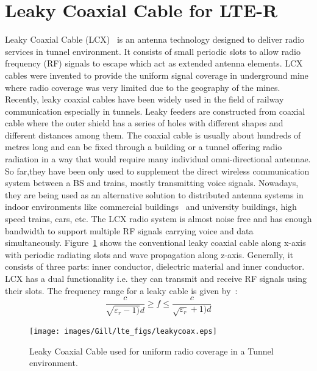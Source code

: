 \section{Leaky Coaxial Cable for LTE-R}
Leaky Coaxial Cable (LCX)~\cite{n1974leaky} is an antenna technology designed to deliver radio services in tunnel environment. It consists of small periodic slots to allow radio frequency (RF) signals to escape which act as extended antenna elements. LCX cables were invented to provide the uniform signal coverage in underground mine where radio coverage was very limited due to the geography of the mines. Recently, leaky coaxial cables have been widely used in the field of railway communication especially in tunnels. Leaky feeders are
constructed from coaxial cable where the outer shield has a series of holes with different shapes and different distances among them. The coaxial cable is usually about hundreds of metres long and can be fixed through a building or a tunnel offering radio radiation in a way that would require many individual omni-directional antennae. So far,they have been only used to supplement the direct wireless communication system between a BS and trains, mostly transmitting voice signals. Nowadays, they are being used as an alternative solution to distributed antenna systems in indoor environments like commercial buildings~\cite{motley1983directed,saleh1987distributed} and university buildings, high speed trains, cars, etc. The LCX radio system is almost noise free and has enough bandwidth to support multiple RF signals carrying voice and data simultaneously. Figure~\ref{fig:leakcoax} shows the conventional leaky coaxial cable along x-axis with periodic radiating slots and wave propagation along z-axis. Generally, it consists of three parts: inner conductor, dielectric material and inner conductor. LCX has a dual functionality i.e. they can transmit and receive RF signals using their slots. The frequency range for a leaky cable is given by~\cite{cao1999radio}:
\begin{equation}
\dfrac{c}{\sqrt{\varepsilon_r-1)}d}\geq f \leq \dfrac{c}{\sqrt{\varepsilon_r}+1)d}
\end{equation}

\begin{figure}[!ht]
\centering
\texttt{[image: images/Gill/lte\_figs/leakycoax.eps]} 
\caption{Leaky Coaxial Cable used for uniform radio coverage in a Tunnel environment.}
\label{fig:leakcoax}
\end{figure}

